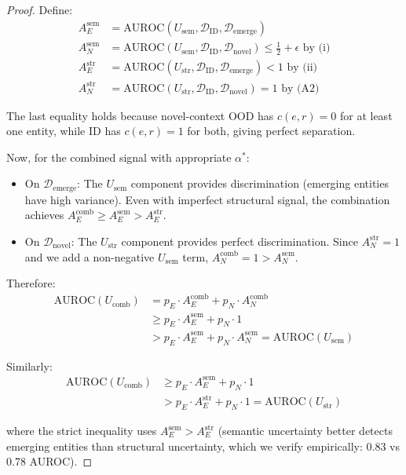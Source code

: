 \begin{proof}
Define:
\begin{align}
    A^{\text{sem}}_E &= \text{AUROC}(U_{\text{sem}}, \mathcal{D}_{\text{ID}}, \mathcal{D}_{\text{emerge}}) \\
    A^{\text{sem}}_N &= \text{AUROC}(U_{\text{sem}}, \mathcal{D}_{\text{ID}}, \mathcal{D}_{\text{novel}}) \leq \frac{1}{2} + \epsilon \text{ by (i)} \\
    A^{\text{str}}_E &= \text{AUROC}(U_{\text{str}}, \mathcal{D}_{\text{ID}}, \mathcal{D}_{\text{emerge}}) < 1 \text{ by (ii)} \\
    A^{\text{str}}_N &= \text{AUROC}(U_{\text{str}}, \mathcal{D}_{\text{ID}}, \mathcal{D}_{\text{novel}}) = 1 \text{ by (A2)}
\end{align}

The last equality holds because novel-context OOD has $c(e,r) = 0$ for at least one entity, while ID has $c(e,r) = 1$ for both, giving perfect separation.

Now, for the combined signal with appropriate $\alpha^*$:
\begin{itemize}
    \item On $\mathcal{D}_{\text{emerge}}$: The $U_{\text{sem}}$ component provides discrimination (emerging entities have high variance). Even with imperfect structural signal, the combination achieves $A^{\text{comb}}_E \geq A^{\text{sem}}_E > A^{\text{str}}_E$.

    \item On $\mathcal{D}_{\text{novel}}$: The $U_{\text{str}}$ component provides perfect discrimination. Since $A^{\text{str}}_N = 1$ and we add a non-negative $U_{\text{sem}}$ term, $A^{\text{comb}}_N = 1 > A^{\text{sem}}_N$.
\end{itemize}

Therefore:
\begin{align}
    \text{AUROC}(U_{\text{comb}}) &= p_E \cdot A^{\text{comb}}_E + p_N \cdot A^{\text{comb}}_N \\
    &\geq p_E \cdot A^{\text{sem}}_E + p_N \cdot 1 \\
    &> p_E \cdot A^{\text{sem}}_E + p_N \cdot A^{\text{sem}}_N = \text{AUROC}(U_{\text{sem}})
\end{align}

Similarly:
\begin{align}
    \text{AUROC}(U_{\text{comb}}) &\geq p_E \cdot A^{\text{sem}}_E + p_N \cdot 1 \\
    &> p_E \cdot A^{\text{str}}_E + p_N \cdot 1 = \text{AUROC}(U_{\text{str}})
\end{align}

where the strict inequality uses $A^{\text{sem}}_E > A^{\text{str}}_E$ (semantic uncertainty better detects emerging entities than structural uncertainty, which we verify empirically: 0.83 vs 0.78 AUROC).
\end{proof}

